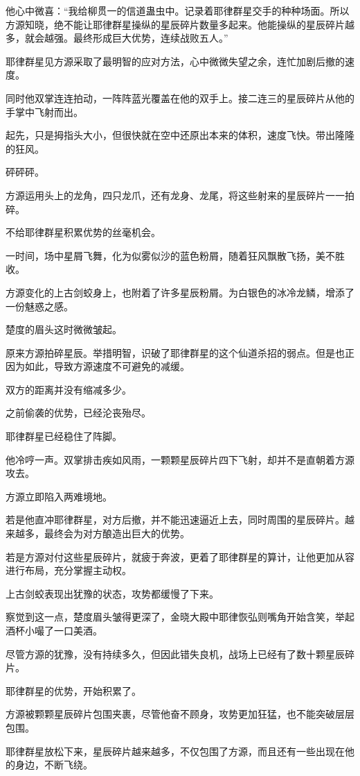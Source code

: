 \begin{this_body}
他心中微喜：“我给柳贯一的信道蛊虫中。记录着耶律群星交手的种种场面。所以方源知晓，绝不能让耶律群星操纵的星辰碎片数量多起来。他能操纵的星辰碎片越多，就会越强。最终形成巨大优势，连续战败五人。”

耶律群星见方源采取了最明智的应对方法，心中微微失望之余，连忙加剧后撤的速度。

同时他双掌连连拍动，一阵阵蓝光覆盖在他的双手上。接二连三的星辰碎片从他的手掌中飞射而出。

起先，只是拇指头大小，但很快就在空中还原出本来的体积，速度飞快。带出隆隆的狂风。

砰砰砰。

方源运用头上的龙角，四只龙爪，还有龙身、龙尾，将这些射来的星辰碎片一一拍碎。

不给耶律群星积累优势的丝毫机会。

一时间，场中星屑飞舞，化为似雾似沙的蓝色粉屑，随着狂风飘散飞扬，美不胜收。

方源变化的上古剑蛟身上，也附着了许多星辰粉屑。为白银色的冰冷龙鳞，增添了一份魅惑之感。

楚度的眉头这时微微皱起。

原来方源拍碎星辰。举措明智，识破了耶律群星的这个仙道杀招的弱点。但是也正因为如此，导致方源速度不可避免的减缓。

双方的距离并没有缩减多少。

之前偷袭的优势，已经沦丧殆尽。

耶律群星已经稳住了阵脚。

他冷哼一声。双掌排击疾如风雨，一颗颗星辰碎片四下飞射，却并不是直朝着方源攻去。

方源立即陷入两难境地。

若是他直冲耶律群星，对方后撤，并不能迅速逼近上去，同时周围的星辰碎片。越来越多，最终会为对方酿造出巨大的优势。

若是方源对付这些星辰碎片，就疲于奔波，更着了耶律群星的算计，让他更加从容进行布局，充分掌握主动权。

上古剑蛟表现出犹豫的状态，攻势都缓慢了下来。

察觉到这一点，楚度眉头皱得更深了，金晓大殿中耶律恢弘则嘴角开始含笑，举起酒杯小嘬了一口美酒。

尽管方源的犹豫，没有持续多久，但因此错失良机，战场上已经有了数十颗星辰碎片。

耶律群星的优势，开始积累了。

方源被颗颗星辰碎片包围夹裹，尽管他奋不顾身，攻势更加狂猛，也不能突破层层包围。

耶律群星放松下来，星辰碎片越来越多，不仅包围了方源，而且还有一些出现在他的身边，不断飞绕。


\end{this_body}
